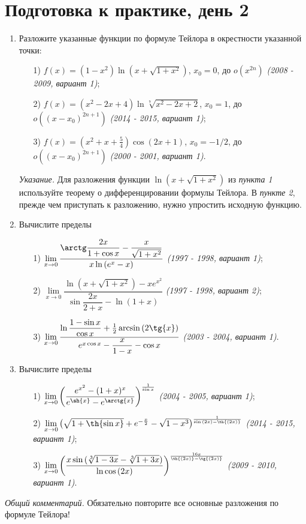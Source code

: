 \documentclass[a4paper,12pt]{article}
\begin{document}
\section*{Подготовка к практике, день 2}

\begin{enumerate}
     	\item Разложите указанные функции по формуле Тейлора в окрестности указанной точки:
     	\begin{enumerate}
     		\item[1)] $f(x) = (1 - x^2) \ln{(x + \sqrt{1 + x^2})}$, $x_0 = 0$, до $o(x^{2n})$ \textit{(2008 - 2009, вариант 1)}; 
     		\item[2)] $f(x) = (x^2 - 2x + 4) \ln{\sqrt[7]{x^2 - 2x + 2}}$, $x_0 = 1$, до $o((x - x_0)^{2n + 1})$ \textit{(2014 - 2015, вариант 1)};   
     		\item[3)] $f(x) = (x^2 + x + \frac{5}{4}) \cos{(2x+1)}$, $x_0 = -1/2$, до $o((x - x_0)^{2n + 1})$ \textit{(2000 - 2001, вариант 1)}.
     	\end{enumerate}
     	\textit{Указание.} Для разложения функции $\ln{(x + \sqrt{1 + x^2})}$ из \textit{пункта 1} используйте теорему о дифференцировании формулы Тейлора. В \textit{пункте 2}, прежде чем приступать к разложению, нужно упростить исходную функцию.
     	
     	\item Вычислите пределы     	
     	\begin{enumerate}
     		\item[1)] $ \lim\limits_{x \to 0} \dfrac{\arctg \dfrac{2x}{1 + \cos{x}} - \dfrac{x}{\sqrt{1 + x^2}}}{ x \ln{(e^x - x)}}$ \textit{(1997 - 1998, вариант 1)}; 
     		\item[2)] $ \lim\limits_{x \to 0} \dfrac{\ln{(x + \sqrt{1 + x^2})} - x e^{x^2}}{ \sin{\dfrac{2x}{2 + x}} - \ln{(1 + x)}}$ \textit{(1997 - 1998, вариант 2)};
     		\item[3)] $ \lim\limits_{x \to 0} \dfrac{\ln{\dfrac{1 - \sin{x}}{\cos{x}}} + \frac{1}{2} \arcsin{(2 \tg{x})}}{ e^{x \cos{x}} - \dfrac{x}{1 - x} - \cos{x}}$ \textit{(2003 - 2004, вариант 1)}.
     	\end{enumerate} 
     	
     	\item Вычислите пределы
     	\begin{enumerate}
     		\item[1)] $ \lim\limits_{x \to 0} \bigg( \dfrac{e^{x^2} - (1+x)^x}{e^{\sh{x}} - e^{\arctg{x}} } \bigg)^{\frac{1}{\sin{x}}}$ \textit{(2004 - 2005, вариант 1)}; 
     		\item[2)] $ \lim\limits_{x \to 0} \big( \sqrt{1 + \th{\sin{x}}} + e^{-\frac{x}{2}} - \sqrt{1 - x^3} \big)^{\frac{1}{\sin{(2x)} - \th{(2x)}}}$ \textit{(2014 - 2015, вариант 1)};
     		\item[3)] $ \lim\limits_{x \to 0} \bigg( \dfrac{x \sin{(\sqrt[3]{1 - 3x} - \sqrt[3]{1 + 3x})}}{\ln{\cos{(2x)}}} \bigg)^{\frac{16x}{\th{(2x)} - \tg{(2x)}}}$ \textit{(2009 - 2010, вариант 1)}.
     	\end{enumerate} 
     	     	
\end{enumerate}

\textit{Общий комментарий.} Обязательно повторите все основные разложения по формуле Тейлора!
\end{document}
